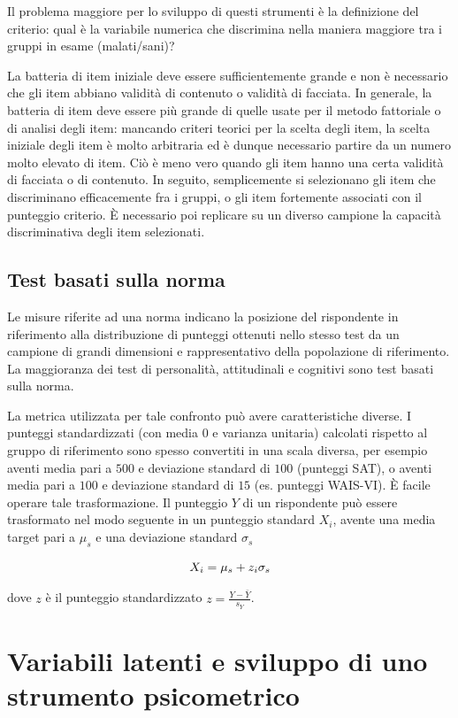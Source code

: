 \documentclass[
  11pt,
]{krantz}
\theoremstyle{definition}
\theoremstyle{definition}
\theoremstyle{definition}
\theoremstyle{definition}
\theoremstyle{remark}
\begin{document}
Il problema maggiore per lo sviluppo di questi strumenti è la definizione del criterio: qual è la variabile numerica che discrimina nella maniera maggiore tra i gruppi in esame (malati/sani)?

La batteria di item iniziale deve essere sufficientemente grande e non è necessario che gli item abbiano validità di contenuto o validità di facciata. In generale, la batteria di item deve essere più grande di quelle usate per il metodo fattoriale o di analisi degli item: mancando criteri teorici per la scelta degli item, la scelta iniziale degli item è molto arbitraria ed è dunque necessario partire da un numero molto elevato di item. Ciò è meno vero quando gli item hanno una certa validità di facciata o di contenuto. In seguito, semplicemente si selezionano gli item che discriminano efficacemente fra i gruppi, o gli item fortemente associati con il punteggio criterio. È necessario poi replicare su un diverso campione la capacità discriminativa degli item selezionati.

\hypertarget{test-basati-sulla-norma}{%
\subsection{Test basati sulla norma}\label{test-basati-sulla-norma}}

Le misure riferite ad una norma indicano la posizione del rispondente in riferimento alla distribuzione di punteggi ottenuti nello stesso test da un campione di grandi dimensioni e rappresentativo della popolazione di riferimento. La maggioranza dei test di personalità, attitudinali e cognitivi sono test basati sulla norma.

La metrica utilizzata per tale confronto può avere caratteristiche diverse. I punteggi standardizzati (con media \(0\) e varianza unitaria) calcolati rispetto al gruppo di riferimento sono spesso convertiti in una scala diversa, per esempio aventi media pari a \(500\) e deviazione standard di \(100\) (punteggi SAT), o aventi media pari a \(100\) e deviazione standard di \(15\) (es. punteggi WAIS-VI). È facile operare tale trasformazione. Il punteggio \(Y\) di un rispondente può essere trasformato nel modo seguente in un punteggio standard \(X_i\), avente una media target pari a \(\mu_s\) e una deviazione standard \(\sigma_s\)

\[X_i = \mu_s + z_i \sigma_s\notag\]

dove \(z\) è il punteggio standardizzato \(z=\frac{Y-\bar{Y}}{s_Y}\).

\hypertarget{variabili-latenti-e-sviluppo-di-uno-strumento-psicometrico}{%
\section{Variabili latenti e sviluppo di uno strumento psicometrico}\label{variabili-latenti-e-sviluppo-di-uno-strumento-psicometrico}}
\end{document}
